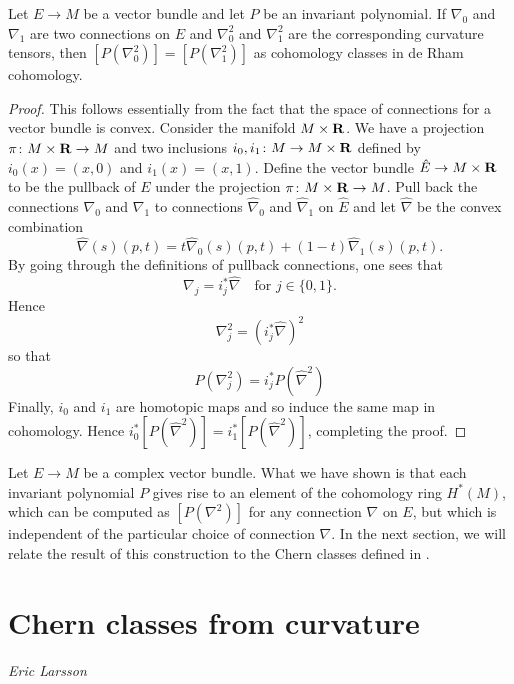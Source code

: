 \documentclass[a4paper,openany]{scrbook}
\newcommand{\chapterauthor}[1]{\hfill\emph{#1}\par\noindent}
\begin{document}
\begin{prop}
Let $E \to M$ be a vector bundle and let $P$ be an invariant polynomial. If $\nabla_0$ and $\nabla_1$ are two connections on $E$ and $\nabla_0^2$ and $\nabla_1^2$ are the corresponding curvature tensors, then $[P(\nabla_0^2)] = [P(\nabla_1^2)]$ as cohomology classes in de Rham cohomology.
\begin{proof}
This follows essentially from the fact that the space of connections for a vector bundle is convex. Consider the manifold $M \times \mathbf R$. We have a projection $\pi \colon M \times \mathbf R \to M$ and two inclusions $i_0, i_1 \colon M \to M \times \mathbf R$ defined by $i_0(x) = (x, 0)$ and $i_1(x) = (x, 1)$.
Define the vector bundle $\hat E \to M \times \mathbf R$ to be the pullback of $E$ under the projection $\pi \colon M \times \mathbf R \to M$. Pull back the connections $\nabla_0$ and $\nabla_1$ to connections $\hat \nabla_0$ and $\hat \nabla_1$ on $\hat E$ and let $\hat \nabla$ be the convex combination
\[\hat \nabla(s)(p, t) = t \hat \nabla_0(s)(p, t) + (1-t) \hat \nabla_1(s)(p, t).\]
By going through the definitions of pullback connections, one sees that
\[\nabla_j = i_j^*\hat\nabla \quad \text{for } j \in \{0, 1\}.\]
Hence
\[\nabla_j^2 = (i_j^* \hat\nabla)^2\]
so that
\[P(\nabla_j^2) = i_j^* P(\hat \nabla^2)\]
Finally, $i_0$ and $i_1$ are homotopic maps and so induce the same map in cohomology. Hence $i_0^* [P(\hat \nabla^2)] = i_1^* [P(\hat \nabla^2)]$, completing the proof.
\end{proof}
\end{prop}

Let $E \to M$ be a complex vector bundle. What we have shown is that each invariant polynomial $P$ gives rise to an element of the cohomology ring $H^*(M)$, which can be computed as $[P(\nabla^2)]$ for any connection $\nabla$ on $E$, but which is independent of the particular choice of connection $\nabla$. In the next section, we will relate the result of this construction to the Chern classes defined in .

\section{Chern classes from curvature}
\chapterauthor{Eric Larsson}
\end{document}
